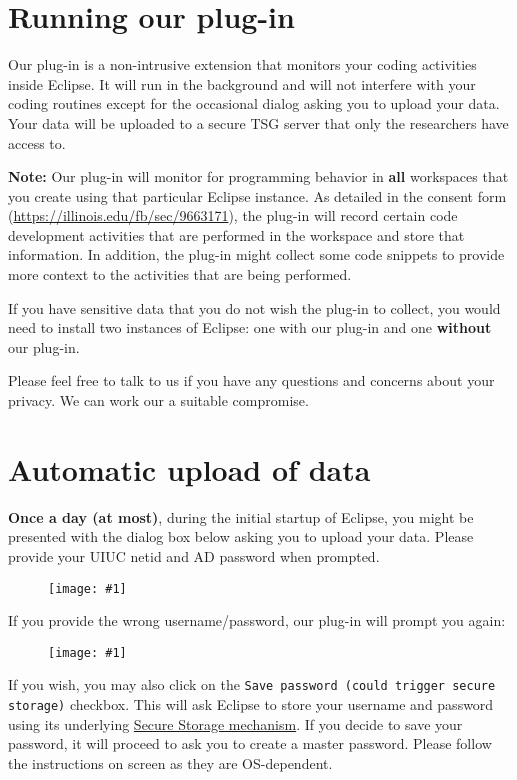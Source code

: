 \documentclass{article}
\newcommand\fig[1]{\texttt{[image: \#1]}}
\newcommand\infonote[1]{\textbf{Note: }#1}
\newcommand\uiref[1]{\texttt{#1}}
\begin{document}
\section{Running our plug-in}
%
Our plug-in is a non-intrusive extension that monitors your coding activities
inside Eclipse. It will run in the background and will not interfere with your
coding routines except for the occasional dialog asking you to upload your data.
Your data will be uploaded to a secure TSG server that only the researchers have
access to.

\infonote{Our plug-in will monitor for programming behavior in \textbf{all}
workspaces that you create using that particular Eclipse instance. As detailed
in the consent form (\url{https://illinois.edu/fb/sec/9663171}), the plug-in
will record certain code development activities that are performed in the
workspace and store that information. In addition, the plug-in might collect
some code snippets to provide more context to the activities that are being
performed.

If you have sensitive data that you do not wish the plug-in to collect, you
would need to install two instances of Eclipse: one with our plug-in and one
\textbf{without} our plug-in.

Please feel free to talk to us if you have any questions and concerns about your
privacy. We can work our a suitable compromise.}
%
\section{Automatic upload of data}

\textbf{Once a day (at most)}, during the initial startup of Eclipse, you might
be presented with the dialog box below asking you to upload your data. Please
provide your UIUC netid and AD password when prompted.

\begin{figure}
%
\centering
%
\fig{figs/login}
%
\end{figure}

If you provide the wrong username/password, our plug-in will prompt you again:

\begin{figure}
%
\centering
%
\fig{figs/prompt}
%
\end{figure}

If you wish, you may also click on the \uiref{Save password (could trigger
secure storage)} checkbox. This will ask Eclipse to store your username and
password using its underlying
\href{http://help.eclipse.org/helios/index.jsp?topic=/org.eclipse.platform.doc.isv/guide/secure_storage_dev.htm}{Secure
Storage mechanism}. If you decide to save your password, it will proceed to ask
you to create a master password. Please follow the instructions on screen as
they are OS-dependent.
\end{document}
